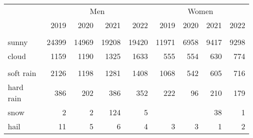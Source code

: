 
\begin{tabular}[t]{lrrrrrrrr}
\toprule
\multicolumn{1}{c}{ } & \multicolumn{4}{c}{Men} & \multicolumn{4}{c}{Women} \\
\cmidrule(l{3pt}r{3pt}){2-5} \cmidrule(l{3pt}r{3pt}){6-9}
  & 2019 & 2020 & 2021 & 2022 & 2019 & 2020 & 2021 & 2022\\
\midrule
\addlinespace[0.3em]
\multicolumn{9}{l}{\textbf{Good}}\\
\hspace{1em}sunny & 24399 & 14969 & 19208 & 19420 & 11971 & 6958 & 9417 & 9298\\
\hspace{1em}cloud & 1159 & 1190 & 1325 & 1633 & 555 & 554 & 630 & 774\\
\addlinespace[0.3em]
\multicolumn{9}{l}{\textbf{Bad}}\\
\hspace{1em}soft rain & 2126 & 1198 & 1281 & 1408 & 1068 & 542 & 605 & 716\\
\hspace{1em}hard rain & 386 & 202 & 386 & 352 & 222 & 96 & 210 & 179\\
\hspace{1em}snow & 2 & 2 & 124 & 5 &  &  & 38 & 1\\
\hspace{1em}hail & 11 & 5 & 6 & 4 & 3 & 3 & 1 & 2\\
\bottomrule
\end{tabular}
